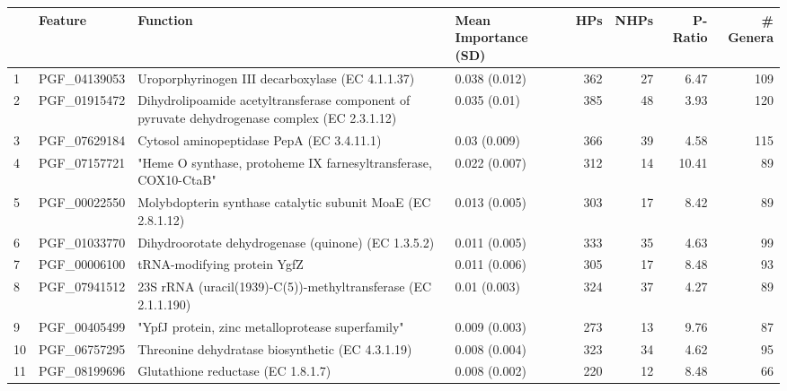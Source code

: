 \begin{tabular}{llllrrrr}
\toprule
{} &       Feature &                                                                                      Function & Mean Importance (SD) &  HPs &  NHPs &  P-Ratio &  \# Genera \\
\midrule
1  &  PGF\_04139053 &                                              Uroporphyrinogen III decarboxylase (EC 4.1.1.37) &        0.038 (0.012) &  362 &    27 &     6.47 &       109 \\
2  &  PGF\_01915472 &  Dihydrolipoamide acetyltransferase component of pyruvate dehydrogenase complex (EC 2.3.1.12) &         0.035 (0.01) &  385 &    48 &     3.93 &       120 \\
3  &  PGF\_07629184 &                                                     Cytosol aminopeptidase PepA (EC 3.4.11.1) &         0.03 (0.009) &  366 &    39 &     4.58 &       115 \\
4  &  PGF\_07157721 &                               "Heme O synthase, protoheme IX farnesyltransferase, COX10-CtaB" &        0.022 (0.007) &  312 &    14 &    10.41 &        89 \\
5  &  PGF\_00022550 &                                   Molybdopterin synthase catalytic subunit MoaE (EC 2.8.1.12) &        0.013 (0.005) &  303 &    17 &     8.42 &        89 \\
6  &  PGF\_01033770 &                                           Dihydroorotate dehydrogenase (quinone) (EC 1.3.5.2) &        0.011 (0.005) &  333 &    35 &     4.63 &        99 \\
7  &  PGF\_00006100 &                                                                   tRNA-modifying protein YgfZ &        0.011 (0.006) &  305 &    17 &     8.48 &        93 \\
8  &  PGF\_07941512 &                                 23S rRNA (uracil(1939)-C(5))-methyltransferase (EC 2.1.1.190) &         0.01 (0.003) &  324 &    37 &     4.27 &        89 \\
9  &  PGF\_00405499 &                                              "YpfJ protein, zinc metalloprotease superfamily" &        0.009 (0.003) &  273 &    13 &     9.76 &        87 \\
10 &  PGF\_06757295 &                                              Threonine dehydratase biosynthetic (EC 4.3.1.19) &        0.008 (0.004) &  323 &    34 &     4.62 &        95 \\
11 &  PGF\_08199696 &                                                            Glutathione reductase (EC 1.8.1.7) &        0.008 (0.002) &  220 &    12 &     8.48 &        66 \\

\end{tabular}

